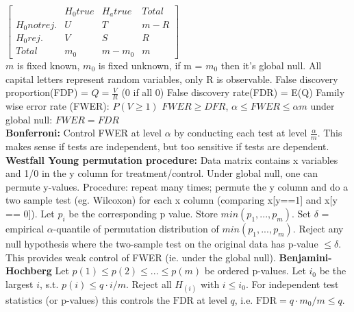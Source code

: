 $\begin{bmatrix}
& H_0 true & H_a true& Total \\
H_0 not rej. & U & T & m-R\\
H_0rej. & V & S & R \\
Total & m_0 & m-m_0 & m
\end{bmatrix}$\\
$m$ is fixed known, $m_0$ is fixed unknown, if m = $m_0$ then it's global null. All capital letters represent random variables, only R is observable. 
False discovery proportion(FDP) = $Q = \frac{V}{R}$ (0 if all 0)
False discovery rate(FDR) = E(Q) 
Family wise error rate (FWER): $P(V \geq 1)$
$FWER \geq DFR$, $\alpha \leq FWER \leq \alpha m$ under global null: $FWER = FDR$ \\
\textbf{Bonferroni: } Control FWER at level $\alpha$ by conducting each test at level $\frac{\alpha}{m}$. This makes sense if tests are independent, but too sensitive if tests are dependent.  \\
\textbf{Westfall Young permutation procedure: } Data matrix contains x variables and 1/0 in the y column for treatment/control. Under global null, one can permute y-values. Procedure: repeat many times; permute the y column and do a two sample test (eg. Wilcoxon) for each x column (comparing x[y==1] and x[y == 0]). Let $p_i$ be the corresponding p value. Store $min(p_1,...,p_m)$. Set $\delta$ = empirical $\alpha$-quantile of permutation distribution of $min(p_1,...,p_m)$. Reject any null hypothesis where the two-sample test on the original data has p-value $\leq \delta$. This provides weak control of FWER (ie. under the global null). 
\textbf{Benjamini-Hochberg}
Let $p(1)\leq p(2) \leq ... \leq p(m)$ be ordered p-values. Let $i_0$ be the largest $i$, s.t. $p(i)\leq q\cdot i / m$. Reject all $H_{(i)}$ with $i\leq i_0$. For independent test statistics (or p-values) this controls the $\text{FDR}$ at level $q$, i.e. $\text{FDR}=q\cdot m_0 / m \leq q$.
